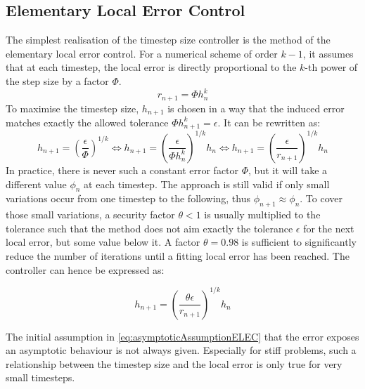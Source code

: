 \subsection{Elementary Local Error Control}
The simplest realisation of the timestep size controller is the method of the elementary local error control. For a numerical scheme of order $k-1$, it assumes that at each timestep, the local error is directly proportional to the $k$-th power of the step size by a factor $\Phi$. 
\begin{equation}
    \label{eq:asymptoticAssumptionELEC}
    r_{n+1} = \Phi h_n^k 
\end{equation}
To maximise the timestep size, $h_{n+1}$ is chosen in a way that the induced error matches exactly the allowed tolerance $\Phi h_{n+1}^k = \epsilon$. It can be rewritten as:
\begin{equation}
    h_{n+1} = \left(\frac{\epsilon}{\Phi}\right)^{1/k}
    \Leftrightarrow 
    h_{n+1} = \left(\frac{\epsilon}{\Phi h_n^k}\right)^{1/k}h_n
    \Leftrightarrow
    h_{n+1} = \left(\frac{\epsilon}{r_{n+1}}\right)^{1/k}h_n
\end{equation}
In practice, there is never such a constant error factor $\Phi$, but it will take a different value $\phi_n$ at each timestep. The approach is still valid if only small variations occur from one timestep to the following, thus $\phi_{n+1} \approx \phi_n$. To cover those small variations, a security factor $\theta < 1$ is usually multiplied to the tolerance such that the method does not aim exactly the tolerance $\epsilon$ for the next local error, but some value below it. A factor $\theta=0.98$ is sufficient to significantly reduce the number of iterations until a fitting local error has been reached. The controller can hence be expressed as:

\begin{equation}
    \label{eq:ELEController}
    h_{n+1} = \left(\frac{\theta\epsilon}{r_{n+1}}\right)^{1/k}h_n
\end{equation}

The initial assumption in \autoref{eq:asymptoticAssumptionELEC} that the error exposes an asymptotic behaviour is not always given. Especially for stiff problems, such a relationship between the timestep size and the local error is only true for very small timesteps. 
